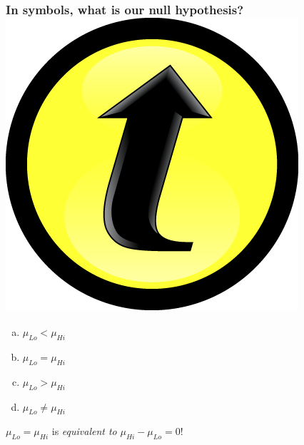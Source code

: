 \documentclass[handout]{beamer}
\begin{document}
\begin{frame}
	\frametitle{In symbols, what is our null hypothesis?\hfill \includegraphics[scale = 0.05]{./images/clicker}}

	\begin{enumerate}[(a)]
		\item $\mu_{Lo} < \mu_{Hi}$
		\item $\mu_{Lo} = \mu_{Hi}$
		\item $\mu_{Lo} > \mu_{Hi}$
		\item $\mu_{Lo} \neq \mu_{Hi}$
	\end{enumerate}
\pause
	\vspace{1em}

	\alert{$\mu_{Lo} = \mu_{Hi}$ is \emph{equivalent to} $\mu_{Hi} - \mu_{Lo} = 0$!}
\end{frame}
\end{document}
